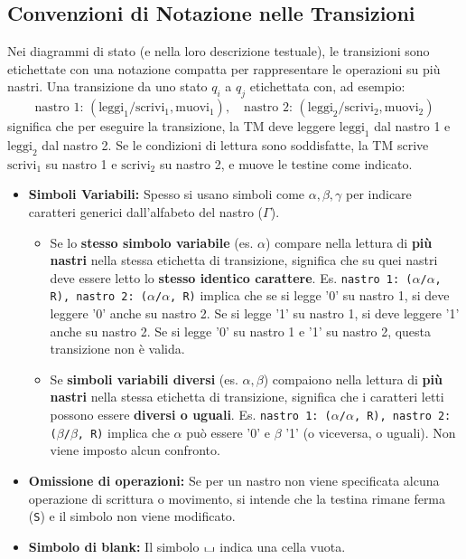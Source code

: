 \documentclass[a4paper]{article}
\theoremstyle{definition} %
\newcommand{\blankS}{\ensuremath{\raisebox{-0.15ex}{\scalebox{1.3}[0.7]{$\sqcup$}}}}
\begin{document}
\subsection{Convenzioni di Notazione nelle Transizioni}
Nei diagrammi di stato (e nella loro descrizione testuale), le transizioni sono etichettate con una notazione compatta per rappresentare le operazioni su più nastri. Una transizione da uno stato $q_i$ a $q_j$ etichettata con, ad esempio:
\[ \text{nastro 1: } (\text{leggi}_1/\text{scrivi}_1, \text{muovi}_1), \quad \text{nastro 2: } (\text{leggi}_2/\text{scrivi}_2, \text{muovi}_2) \]
significa che per eseguire la transizione, la TM deve leggere $\text{leggi}_1$ dal nastro 1 e $\text{leggi}_2$ dal nastro 2. Se le condizioni di lettura sono soddisfatte, la TM scrive $\text{scrivi}_1$ su nastro 1 e $\text{scrivi}_2$ su nastro 2, e muove le testine come indicato.

\begin{itemize}
    \item \textbf{Simboli Variabili:} Spesso si usano simboli come $\alpha, \beta, \gamma$ per indicare caratteri generici dall'alfabeto del nastro ($\Gamma$).
    \begin{itemize}
        \item Se lo \textbf{stesso simbolo variabile} (es. $\alpha$) compare nella lettura di \textbf{più nastri} nella stessa etichetta di transizione, significa che su quei nastri deve essere letto lo \textbf{stesso identico carattere}. Es. \texttt{nastro 1: ($\alpha$/$\alpha$, R), nastro 2: ($\alpha$/$\alpha$, R)} implica che se si legge '0' su nastro 1, si deve leggere '0' anche su nastro 2. Se si legge '1' su nastro 1, si deve leggere '1' anche su nastro 2. Se si legge '0' su nastro 1 e '1' su nastro 2, questa transizione non è valida.
        \item Se \textbf{simboli variabili diversi} (es. $\alpha, \beta$) compaiono nella lettura di \textbf{più nastri} nella stessa etichetta di transizione, significa che i caratteri letti possono essere \textbf{diversi o uguali}. Es. \texttt{nastro 1: ($\alpha$/$\alpha$, R), nastro 2: ($\beta$/$\beta$, R)} implica che $\alpha$ può essere '0' e $\beta$ '1' (o viceversa, o uguali). Non viene imposto alcun confronto.
    \end{itemize}
    \item \textbf{Omissione di operazioni:} Se per un nastro non viene specificata alcuna operazione di scrittura o movimento, si intende che la testina rimane ferma (\texttt{S}) e il simbolo non viene modificato.
    \item \textbf{Simbolo di blank:} Il simbolo $\blankS$ indica una cella vuota.
\end{itemize}
\end{document}
